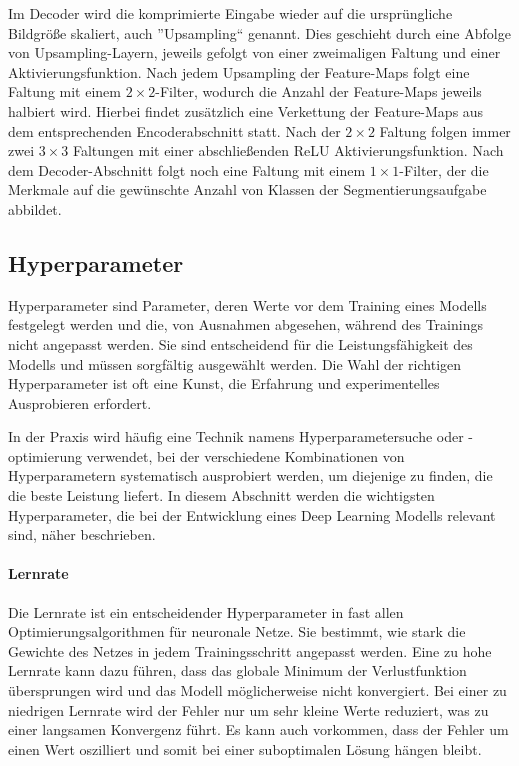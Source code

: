 Im Decoder wird die komprimierte Eingabe wieder auf die ursprüngliche Bildgröße skaliert, auch ''Upsampling`` genannt. Dies geschieht durch eine Abfolge von Upsampling-Layern, jeweils gefolgt von einer zweimaligen Faltung und einer Aktivierungsfunktion. Nach jedem Upsampling der Feature-Maps folgt eine Faltung mit einem $2\times2$-Filter, wodurch die Anzahl der Feature-Maps jeweils halbiert wird. Hierbei findet zusätzlich eine Verkettung der Feature-Maps aus dem entsprechenden Encoderabschnitt statt. Nach der $2\times2$ Faltung folgen immer zwei $3\times3$ Faltungen mit einer abschließenden ReLU Aktivierungsfunktion. Nach dem Decoder-Abschnitt folgt noch eine Faltung mit einem $1\times1$-Filter, der die Merkmale auf die gewünschte Anzahl von Klassen der Segmentierungsaufgabe abbildet. \cite[vgl.][]{Ronneberger2015}

\subsection{Hyperparameter}
Hyperparameter sind Parameter, deren Werte vor dem Training eines \gls{Modell}s festgelegt werden und die, von Ausnahmen abgesehen, während des Trainings nicht angepasst werden. Sie sind entscheidend für die Leistungsfähigkeit des Modells und müssen sorgfältig ausgewählt werden. Die Wahl der richtigen Hyperparameter ist oft eine Kunst, die Erfahrung und experimentelles Ausprobieren erfordert. 

In der Praxis wird häufig eine Technik namens Hyperparametersuche oder -optimierung verwendet, bei der verschiedene Kombinationen von Hyperparametern systematisch ausprobiert werden, um diejenige zu finden, die die beste Leistung liefert. In diesem Abschnitt werden die wichtigsten Hyperparameter, die bei der Entwicklung eines Deep Learning \gls{Modell}s relevant sind, näher beschrieben.

\paragraph{Lernrate} Die Lernrate ist ein entscheidender Hyperparameter in fast allen Optimierungsalgorithmen für neuronale Netze. Sie bestimmt, wie stark die Gewichte des Netzes in jedem Trainingsschritt angepasst werden. Eine zu hohe Lernrate kann dazu führen, dass das globale Minimum der Verlustfunktion übersprungen wird und das \gls{Modell} möglicherweise nicht konvergiert. Bei einer zu niedrigen Lernrate wird der Fehler nur um sehr kleine Werte reduziert, was zu einer langsamen Konvergenz führt. Es kann auch vorkommen, dass der Fehler um einen Wert oszilliert und somit bei einer suboptimalen Lösung hängen bleibt. \cite[vgl.][]{Pfannstiel2022}

